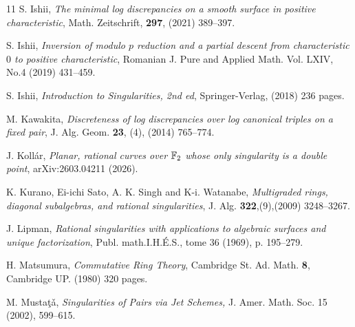 \documentclass[a4paper]{amsart}
\let \cedilla =\c
\theoremstyle{definition}
\begin{document}
\begin{thebibliography}{11}
 S. Ishii, {\em The minimal log discrepancies on a smooth surface in positive    
                       characteristic}, Math. Zeitschrift, {\bf 297}, (2021) 389--397.

 S. Ishii, {\em  Inversion of modulo $p$ reduction and a partial descent from characteristic $0$ to positive characteristic},  Romanian J.  Pure and Applied Math.
Vol. LXIV, No.4 (2019) 431--459.

 S. Ishii, {\em Introduction to Singularities, 2nd ed}, Springer-Verlag, (2018) 236 pages.



 M. Kawakita, {\em Discreteness of log discrepancies over log canonical triples on a fixed pair},  J. Alg. Geom. {\bf  23}, (4), (2014) 765--774.





 J. Koll\'ar,  {\em Planar, rational curves over $\Bbb{F}_2$ whose only singularity is a double point}, arXiv:2603.04211 (2026). 


 K. Kurano, Ei-ichi Sato, A. K. Singh and K-i. Watanabe, 
{\em Multigraded rings, diagonal subalgebras, and rational singularities}, 
J. Alg. 
{\bf 322},(9),(2009) 3248--3267.


 J. Lipman, {\em Rational singularities with applications to algebraic
surfaces and unique factorization},
Publ. math.I.H.\'E.S., tome 36 (1969), p. 195--279.





 H. Matsumura, {\em Commutative Ring Theory}, Cambridge St. Ad. Math. 
{\bf 8}, Cambridge UP. (1980) 320 pages. 

 M. Musta\cedilla{t}\v{a}, {\em Singularities of Pairs via Jet Schemes,}
           J. Amer. Math. Soc. 15 (2002), 599--615.





\end{thebibliography}
\end{document}
